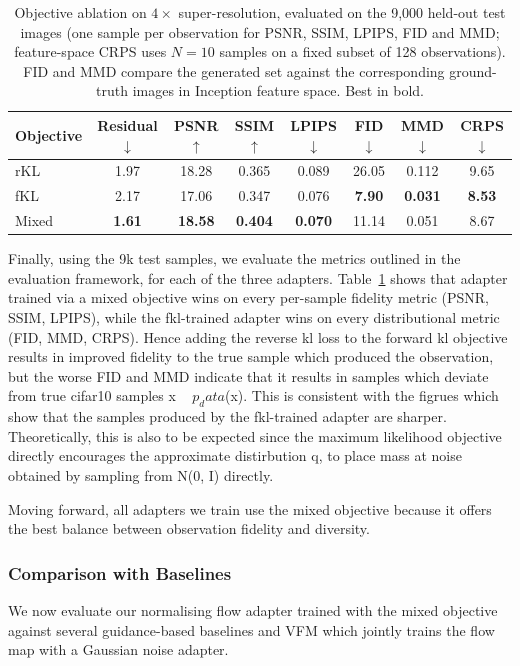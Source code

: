 \documentclass[12pt,a4paper]{report}
\begin{document}
\begin{table}[t]
\centering
\small
\begin{tabular}{l ccccccc}
\toprule
Objective & Residual $\downarrow$ & PSNR $\uparrow$ & SSIM $\uparrow$ & LPIPS $\downarrow$ & FID $\downarrow$ & MMD $\downarrow$ & CRPS $\downarrow$ \\
\midrule
rKL   & 1.97 & 18.28 & 0.365 & 0.089 & 26.05 & 0.112 & 9.65 \\
fKL   & 2.17 & 17.06 & 0.347 & 0.076 & \textbf{7.90} & \textbf{0.031} & \textbf{8.53} \\
Mixed & \textbf{1.61} & \textbf{18.58} & \textbf{0.404} & \textbf{0.070} & 11.14 & 0.051 & 8.67 \\
\bottomrule
\end{tabular}
\caption{Objective ablation on $4\times$ super-resolution, evaluated on the
9{,}000 held-out test images (one sample per observation for PSNR, SSIM, LPIPS,
FID and MMD; feature-space CRPS uses $N{=}10$ samples on a fixed subset of 128
observations). FID and MMD compare the generated set against the corresponding
ground-truth images in Inception feature space. Best in bold.}
\label{tab:sr_ablation}
\end{table}

Finally, using the 9k test samples, we evaluate the metrics outlined in the evaluation framework, for each of the three adapters. 
Table~\ref{tab:sr_ablation} shows that adapter trained via a mixed objective wins on every per-sample fidelity metric (PSNR, SSIM, LPIPS), while the fkl-trained adapter wins on every distributional metric (FID, MMD, CRPS). 
Hence adding the reverse kl loss to the forward kl objective results in improved fidelity to the true sample which produced the observation, but the worse FID and MMD indicate that it results in samples which deviate from true cifar10 samples x ~ $p_data$(x). This is consistent with the figrues which show that the samples produced by the fkl-trained adapter are sharper. Theoretically, this is also to be expected since the maximum likelihood objective directly encourages the approximate distirbution q, to place mass at noise obtained by sampling from N(0, I) directly. 

Moving forward, all adapters we train use the mixed objective because it offers the best balance between observation fidelity and diversity. 

\subsubsection{Comparison with Baselines}
We now evaluate our normalising flow adapter trained with the mixed objective against several guidance-based baselines and VFM which jointly trains the flow map with a Gaussian noise adapter. 
\end{document}
